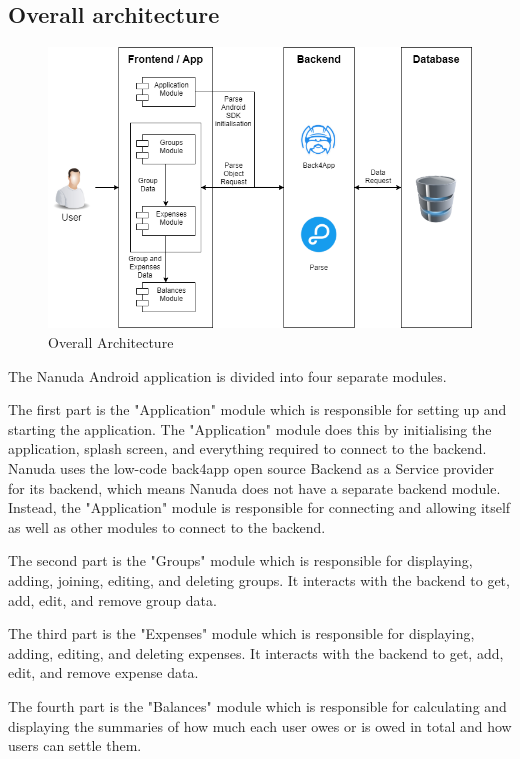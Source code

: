 \documentclass[conference]{IEEEtran}
\begin{document}
\subsection{Overall architecture}
    \begin{figure}[H]
        \centerline{\includegraphics[scale=0.35]{img/overall_architecture.png}}
        \caption{Overall Architecture}
        \label{fig:overall-architecture}
    \end{figure}

The Nanuda Android application is divided into four separate modules.

The first part is the "Application" module which is responsible for setting up and starting the application. The "Application" module does this by initialising the application, splash screen, and everything required to connect to the backend. Nanuda uses the low-code back4app open source Backend as a Service provider for its backend, which means Nanuda does not have a separate backend module. Instead, the "Application" module is responsible for connecting and allowing itself as well as other modules to connect to the backend.

The second part is the "Groups" module which is responsible for displaying, adding, joining, editing, and deleting groups. It interacts with the backend to get, add, edit, and remove group data.

The third part is the "Expenses" module which is responsible for displaying, adding, editing, and deleting expenses. It interacts with the backend to get, add, edit, and remove expense data.

The fourth part is the "Balances" module which is responsible for calculating and displaying the summaries of how much each user owes or is owed in total and how users can settle them.
\end{document}
